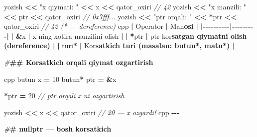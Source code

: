 \documentclass[a4paper,11pt,twoside,openright]{book}
\newenvironment{Shaded}{\begin{snugshade}}{\end{snugshade}}
\newcommand{\CharTok}[1]{\textcolor[rgb]{0.31,0.60,0.02}{#1}}
\newcommand{\CommentTok}[1]{\textcolor[rgb]{0.56,0.35,0.01}{\textit{#1}}}
\newcommand{\DecValTok}[1]{\textcolor[rgb]{0.00,0.00,0.81}{#1}}
\newcommand{\ErrorTok}[1]{\textcolor[rgb]{0.64,0.00,0.00}{\textbf{#1}}}
\newcommand{\NormalTok}[1]{#1}
\newcommand{\OperatorTok}[1]{\textcolor[rgb]{0.81,0.36,0.00}{\textbf{#1}}}
\newcommand{\PreprocessorTok}[1]{\textcolor[rgb]{0.56,0.35,0.01}{\textit{#1}}}
\newcommand{\StringTok}[1]{\textcolor[rgb]{0.31,0.60,0.02}{#1}}
\begin{document}
\begin{Shaded}
\begin{Highlighting}[]
\NormalTok{yozish }\OperatorTok{\textless{}\textless{}} \StringTok{"x qiymati: "} \OperatorTok{\textless{}\textless{}}\NormalTok{ x }\OperatorTok{\textless{}\textless{}}\NormalTok{ qator\_oxiri        }\CommentTok{// 42}
\NormalTok{yozish }\OperatorTok{\textless{}\textless{}} \StringTok{"x manzili: "} \OperatorTok{\textless{}\textless{}}\NormalTok{ ptr }\OperatorTok{\textless{}\textless{}}\NormalTok{ qator\_oxiri      }\CommentTok{// 0x7fff...}
\NormalTok{yozish }\OperatorTok{\textless{}\textless{}} \StringTok{"ptr orqali: "} \OperatorTok{\textless{}\textless{}} \OperatorTok{*}\NormalTok{ptr }\OperatorTok{\textless{}\textless{}}\NormalTok{ qator\_oxiri    }\CommentTok{// 42 (* — dereference)}
\ErrorTok{\textasciigrave{}\textasciigrave{}\textasciigrave{}}\NormalTok{cpp}
\OperatorTok{|}\NormalTok{ Operator }\OperatorTok{|}\NormalTok{ Ma}\CharTok{\textquotesingle{}n}\ErrorTok{osi |}
\OperatorTok{|{-}{-}{-}{-}{-}{-}{-}{-}{-}{-}|{-}{-}{-}{-}{-}{-}{-}{-}{-}|}
\OperatorTok{|} \ErrorTok{\textasciigrave{}}\OperatorTok{\&}\NormalTok{x}\ErrorTok{\textasciigrave{}} \OperatorTok{|}\NormalTok{ x ning xotira manzilini olish }\OperatorTok{|}
\OperatorTok{|} \ErrorTok{\textasciigrave{}}\OperatorTok{*}\NormalTok{ptr}\ErrorTok{\textasciigrave{}} \OperatorTok{|}\NormalTok{ ptr ko}\CharTok{\textquotesingle{}r}\ErrorTok{satgan qiymatni olish (dereference) |}
\OperatorTok{|} \ErrorTok{\textasciigrave{}}\NormalTok{turi}\OperatorTok{*}\ErrorTok{\textasciigrave{}} \OperatorTok{|}\NormalTok{ Ko}\CharTok{\textquotesingle{}r}\ErrorTok{satkich turi (masalan: \textasciigrave{}butun*\textasciigrave{}, \textasciigrave{}matn*\textasciigrave{}) |}

\PreprocessorTok{\#}\ErrorTok{\#\# Ko\textquotesingle{}rsatkich orqali qiymat o\textquotesingle{}zgartirish}

\ErrorTok{\textasciigrave{}\textasciigrave{}\textasciigrave{}}\NormalTok{cpp}
\NormalTok{butun x }\OperatorTok{=} \DecValTok{10}
\NormalTok{butun}\OperatorTok{*}\NormalTok{ ptr }\OperatorTok{=} \OperatorTok{\&}\NormalTok{x}

\OperatorTok{*}\NormalTok{ptr }\OperatorTok{=} \DecValTok{20}    \CommentTok{// ptr orqali x ni o\textquotesingle{}zgartirish}

\NormalTok{yozish }\OperatorTok{\textless{}\textless{}}\NormalTok{ x }\OperatorTok{\textless{}\textless{}}\NormalTok{ qator\_oxiri   }\CommentTok{// 20 — x o\textquotesingle{}zgardi!}
\ErrorTok{\textasciigrave{}\textasciigrave{}\textasciigrave{}}\NormalTok{cpp}
\OperatorTok{{-}{-}{-}}

\PreprocessorTok{\#}\ErrorTok{\# \textasciigrave{}nullptr\textasciigrave{} — bo\textquotesingle{}sh ko\textquotesingle{}rsatkich}


\end{Highlighting}
\end{Shaded}
\end{document}
